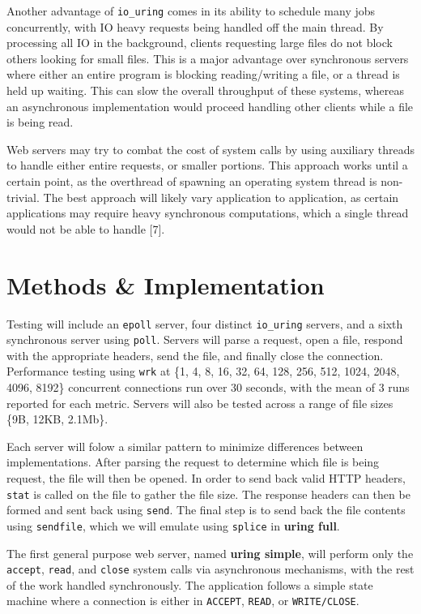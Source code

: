 \documentclass[conference]{IEEEtran}{}
\makeatletter
\newcommand{\citeprocitem}[2]{\hyper@linkstart{cite}{citeproc_bib_item_#1}#2\hyper@linkend}
\makeatother
\begin{document}
Another advantage of \texttt{io\_uring} comes in its ability to schedule many jobs concurrently, with IO heavy requests being handled off the main thread. By processing all IO in the background, clients requesting large files do not block others looking for small files. This is a major advantage over synchronous servers where either an entire program is blocking reading/writing a file, or a thread is held up waiting. This can slow the overall throughput of these systems, whereas an asynchronous implementation would proceed handling other clients while a file is being read.

Web servers may try to combat the cost of system calls by using auxiliary threads to handle either entire requests, or smaller portions. This approach works until a certain point, as the overthread of spawning an operating system thread is non-trivial. The best approach will likely vary application to application, as certain applications may require heavy synchronous computations, which a single thread would not be able to handle \citeprocitem{7}{[7]}.

\section{Methods \& Implementation}
\label{sec:org8014bf3}
Testing will include an \texttt{epoll} server, four distinct \texttt{io\_uring} servers, and a sixth synchronous server using \texttt{poll}. Servers will parse a request, open a file, respond with the appropriate headers, send the file, and finally close the connection. Performance testing using \texttt{wrk} at \{1, 4, 8, 16, 32, 64, 128, 256, 512, 1024, 2048, 4096, 8192\} concurrent connections run over 30 seconds, with the mean of 3 runs reported for each metric. Servers will also be tested across a range of file sizes \{9B, 12KB, 2.1Mb\}.

Each server will folow a similar pattern to minimize differences between implementations. After parsing the request to determine which file is being request, the file will then be opened. In order to send back valid HTTP headers, \texttt{stat} is called on the file to gather the file size. The response headers can then be formed and sent back using \texttt{send}. The final step is to send back the file contents using \texttt{sendfile}, which we will emulate using \texttt{splice} in \textbf{uring full}.

The first general purpose web server, named \textbf{uring simple}, will perform only the \texttt{accept}, \texttt{read}, and \texttt{close} system calls via asynchronous mechanisms, with the rest of the work handled synchronously. The application follows a simple state machine where a connection is either in \texttt{ACCEPT}, \texttt{READ}, or \texttt{WRITE/CLOSE}.
\end{document}
